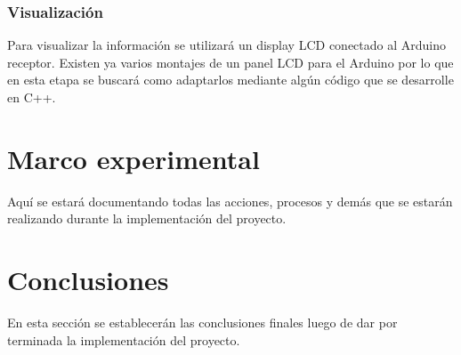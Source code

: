 \documentclass{article}
\begin{document}
\subsubsection{Visualización}
Para visualizar la información se utilizará un display LCD conectado al Arduino receptor. Existen ya varios montajes de un panel LCD para el Arduino por lo que en esta etapa se buscará como adaptarlos mediante algún código que se desarrolle en C++.


\newpage

\section{Marco experimental} \label{contenido}
Aquí se estará documentando todas las acciones, procesos y demás que se estarán realizando durante la implementación del proyecto.



\newpage
\section{Conclusiones} \label{conclusiones}
En esta sección se establecerán las conclusiones finales luego de dar por terminada la implementación del proyecto.



\end{document}
